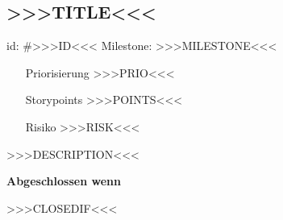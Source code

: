 
\subsection*{>>>TITLE<<<}
id: \#>>>ID<<< Milestone: >>>MILESTONE<<<\\

\begin{itemize}
\item[Priorisierung] >>>PRIO<<<
\item[Storypoints] >>>POINTS<<<
\item[Risiko] >>>RISK<<<
\end{itemize}

>>>DESCRIPTION<<<

\textbf{Abgeschlossen wenn}
\begin{todolist}
  >>>CLOSEDIF<<<
\end{todolist}

